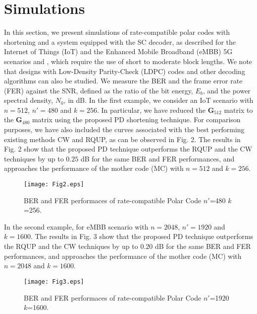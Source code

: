 \documentclass[10pt,twocolumn]{IEEEtran}
\begin{document}
\section{Simulations}

In this section, we present simulations of rate-compatible polar
codes with shortening and a system equipped with the SC decoder, as
described for the Internet of Things (IoT) and the Enhanced Mobile
Broadband (eMBB) 5G scenarios \cite{Bioglio} and \cite{Ferreira},
which require the use of short to moderate block lengths. We note
that designs with Low-Density Parity-Check (LDPC) codes
\cite{bfpeg,dopeg,memd} and other decoding algorithms
\cite{mmimo,vfap,spa,jidf,mfsic,did,mbdf,bfidd} can also be studied.
We measure the BER and the frame error rate (FER) against the SNR,
defined as the ratio of the bit energy, $E_b$, and the power
spectral density, $N_0$, in dB. In the first example, we consider an
IoT scenario with $n=512$, $n'=480$ and $k=256$. In particular, we
have reduced the $\textbf{G}_{512}$ matrix to the $\textbf{G}_{480}$
matrix using the proposed PD shortening technique. For comparison
purposes, we have also included the curves associated with the best
performing existing methods CW and RQUP, as can be observed in Fig.
2. The results in Fig. 2 show that the proposed PD technique
outperforms the RQUP and the CW techniques by up to $0.25$ dB for
the same BER and FER performances, and approaches the performance of
the mother code (MC) with $n=512$ and $k=256$.

\begin{figure}[htb]
\begin{center}
\texttt{[image: Fig2.eps]}
\caption{BER and FER performaces of rate-compatible Polar Code
$n'$=480 $k$=256.}
\end{center}
\label{figura:fig03}
\end{figure}

In the second example, for eMBB scenario with $n=2048$, $n'=1920$
and $k=1600$. The results in Fig. 3 show that the proposed PD
technique outperforms the RQUP and the CW techniques by up to $0.20$
dB for the same BER and FER performances, and approaches the
performance of the mother code (MC) with $n=2048$ and $k=1600$.

\begin{figure}[htb]
\begin{center}
\texttt{[image: Fig3.eps]}
\caption{BER and FER performaces of rate-compatible Polar Code
$n'$=1920 $k$=1600.}
\end{center}
\label{figura:fig04}
\end{figure}
\end{document}
